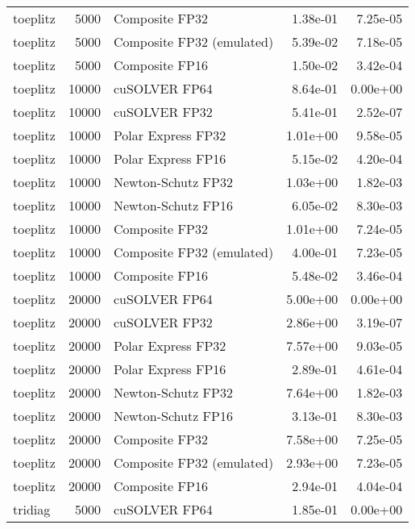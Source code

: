 \begin{table}
\begin{tabular}{lrlrr}
 toeplitz &  5000 &            Composite FP32 &  1.38e-01 &        7.25e-05 \\
 toeplitz &  5000 & Composite FP32 (emulated) &  5.39e-02 &        7.18e-05 \\
 toeplitz &  5000 &            Composite FP16 &  1.50e-02 &        3.42e-04 \\
 toeplitz & 10000 &             cuSOLVER FP64 &  8.64e-01 &        0.00e+00 \\
 toeplitz & 10000 &             cuSOLVER FP32 &  5.41e-01 &        2.52e-07 \\
 toeplitz & 10000 &        Polar Express FP32 &  1.01e+00 &        9.58e-05 \\
 toeplitz & 10000 &        Polar Express FP16 &  5.15e-02 &        4.20e-04 \\
 toeplitz & 10000 &        Newton-Schutz FP32 &  1.03e+00 &        1.82e-03 \\
 toeplitz & 10000 &        Newton-Schutz FP16 &  6.05e-02 &        8.30e-03 \\
 toeplitz & 10000 &            Composite FP32 &  1.01e+00 &        7.24e-05 \\
 toeplitz & 10000 & Composite FP32 (emulated) &  4.00e-01 &        7.23e-05 \\
 toeplitz & 10000 &            Composite FP16 &  5.48e-02 &        3.46e-04 \\
 toeplitz & 20000 &             cuSOLVER FP64 &  5.00e+00 &        0.00e+00 \\
 toeplitz & 20000 &             cuSOLVER FP32 &  2.86e+00 &        3.19e-07 \\
 toeplitz & 20000 &        Polar Express FP32 &  7.57e+00 &        9.03e-05 \\
 toeplitz & 20000 &        Polar Express FP16 &  2.89e-01 &        4.61e-04 \\
 toeplitz & 20000 &        Newton-Schutz FP32 &  7.64e+00 &        1.82e-03 \\
 toeplitz & 20000 &        Newton-Schutz FP16 &  3.13e-01 &        8.30e-03 \\
 toeplitz & 20000 &            Composite FP32 &  7.58e+00 &        7.25e-05 \\
 toeplitz & 20000 & Composite FP32 (emulated) &  2.93e+00 &        7.23e-05 \\
 toeplitz & 20000 &            Composite FP16 &  2.94e-01 &        4.04e-04 \\
  tridiag &  5000 &             cuSOLVER FP64 &  1.85e-01 &        0.00e+00 \\

\end{tabular}
\end{table}
